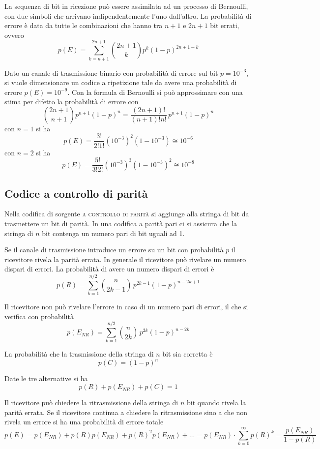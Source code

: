 La sequenza di bit in ricezione può essere assimilata ad un processo di Bernoulli, con due simboli che arrivano indipendentemente l'uno dall'altro. La probabilità di errore è data da tutte le combinazioni che hanno tra $n+1$ e $2n+1$ bit errati, ovvero
\[p(E)=\sum_{k=n+1}^{2n+1}\binom{2n+1}{k}p^k(1-p)^{2n+1-k}\]

\begin{esempio}
Dato un canale di trasmissione binario con probabilità di errore sul bit $p=10^{-3}$, si vuole dimensionare un codice a ripetizione tale da avere una probabilità di errore $p(E)=10^{-9}$.
Con la formula di Bernoulli si può approssimare con una stima per difetto la probabilità di errore con
\[
	\binom{2n+1}{n+1}p^{n+1}(1-p)^n=\frac{(2n+1)!}{(n+1)!n!}\,p^{n+1}(1-p)^n
\]
con $n=1$ si ha
\[
	p(E)=\frac{3!}{2!1!}(10^{-3})^2(1-10^{-3})\cong 10^{-6}
\]
con $n=2$ si ha 
\[
	p(E)=\frac{5!}{3!2!}(10^{-3})^3(1-10^{-3})^2\cong 10^{-8}
\]
\end{esempio}

\subsection{Codice a controllo di parità}
Nella codifica di sorgente \textsc{a controllo di parità} si aggiunge alla stringa di bit da trasmettere un bit di parità. In una codifica a parità pari ci si assicura che la stringa di $n$ bit contenga un numero pari di bit uguali ad 1.

Se il canale di trasmissione introduce un errore su un bit con probabilità $p$ il ricevitore rivela la parità errata. In generale il ricevitore può rivelare un numero dispari di errori.
La probabilità di avere un numero dispari di errori è
\[
	p(R)=\sum_{k=1}^{n/2}\binom{n}{2k-1}\,p^{2k-1}(1-p)^{n-2k+1}
\]

Il ricevitore non può rivelare l'errore in caso di un numero pari di errori, il che si verifica con probabilità
\[
	p(E_{NR})=\sum_{k=1}^{n/2}\binom{n}{2k}\,p^{2k}(1-p)^{n-2k}
\]

La probabilità che la trasmissione della stringa di $n$ bit sia corretta è
\[
	p(C)=(1-p)^n
\]

Date le tre alternative si ha
\[
	p(R)+p(E_{NR})+p(C)=1
\]

Il ricevitore può chiedere la ritrasmissione della stringa di $n$ bit quando rivela la parità errata.
Se il ricevitore continua a chiedere la ritrasmissione sino a che non rivela un errore si ha una probabilità di errore totale
\[
	p(E)=p(E_{NR})+p(R)p(E_{NR})+p(R)^2p(E_{NR})+\dots=p(E_{NR})\cdot\sum_{k=0}^{\infty}p(R)^k=\frac{p(E_{NR})}{1-p(R)}
\]

